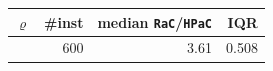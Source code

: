 \begin{tabular}{@{}rrrr@{}}
\toprule
$\varrho$ & \#inst & median \texttt{RaC}/\texttt{HPaC} & IQR \\
\midrule
 & 600 & 3.61 & 0.508 \\
\bottomrule
\end{tabular}

